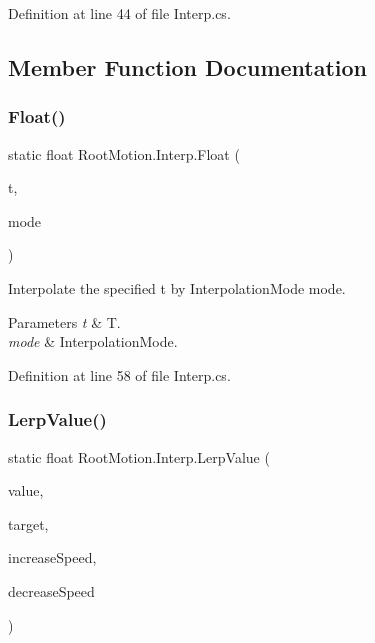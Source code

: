 Definition at line 44 of file Interp.\+cs.



\subsection{Member Function Documentation}
\mbox{\label{class_root_motion_1_1_interp_abae271011391a41e77fcb3a526baafc3}} 
\subsubsection{\texorpdfstring{Float()}{Float()}}
{\footnotesize\ttfamily static float Root\+Motion.\+Interp.\+Float (\begin{DoxyParamCaption}\item[{float}]{t,  }\item[{\mbox{\hyperlink{namespace_root_motion_ab1cbf9354347d1a3d238c06200006b9f}{Interpolation\+Mode}}}]{mode }\end{DoxyParamCaption})\hspace{0.3cm}{\ttfamily [static]}}



Interpolate the specified t by Interpolation\+Mode mode. 


\begin{DoxyParams}{Parameters}
{\em t} & T. \\
\hline
{\em mode} & Interpolation\+Mode. \\
\hline
\end{DoxyParams}


Definition at line 58 of file Interp.\+cs.

\mbox{\label{class_root_motion_1_1_interp_ad69af8ecf172f7e7a2a6594ade2b9a48}} 
\subsubsection{\texorpdfstring{Lerp\+Value()}{LerpValue()}}
{\footnotesize\ttfamily static float Root\+Motion.\+Interp.\+Lerp\+Value (\begin{DoxyParamCaption}\item[{float}]{value,  }\item[{float}]{target,  }\item[{float}]{increase\+Speed,  }\item[{float}]{decrease\+Speed }\end{DoxyParamCaption})\hspace{0.3cm}{\ttfamily [static]}}



